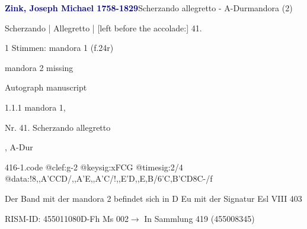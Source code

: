 \documentclass[twocolumn, 12pt]{book}
\begin{document}
\par \vspace{16pt} \textcolor{darkblue}{\textbf{Zink, Joseph Michael  1758-1829}}\hfillplus{\textbf{[416]}}\newline Scherzando allegretto - A-Dur\newline mandora (2)
\par \begin{itshape}[f.24r, at left:] Scherzando | Allegretto | [left before the accolade:] 41.\end{itshape} 
\par \textcolor{darkblue}{}  1 Stimmen: mandora 1  (f.24r)\newline \begin{small} mandora 2 missing\end{small} \newline Autograph manuscript
\par 1.1.1  mandora 1, \begin{itshape}Nr. 41. Scherzando allegretto\end{itshape}, A-Dur  
\begin{filecontents*}{416-1.code}
@clef:g-2
@keysig:xFCG
@timesig:2/4
@data:!8,,A'CCD/,,A'E,,A'C/!,,E'D,,E,B/{6'C,B'CD}8C-/f
\end{filecontents*}
\newline %
\par Der Band mit der mandora 2 befindet sich in D Eu mit der Signatur Esl VIII 403
\par RISM-ID: 455011080\newline D-Fh  Ms 002\newline $\rightarrow$ In Sammlung 419 (455008345)
      
\end{document}
